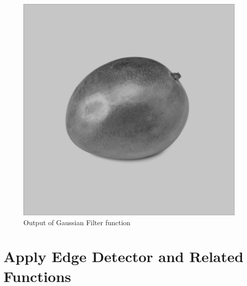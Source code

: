 \documentclass[12pt,a4paper]{report}
\begin{document}
\begin{figure}[!htb]
    \centering
      \includegraphics[height=0.4\paperheight]{output/gaussian.jpg}
    \caption{Output of Gaussian Filter function}
\end{figure}
\clearpage


\section{Apply Edge Detector and Related Functions}
\end{document}
